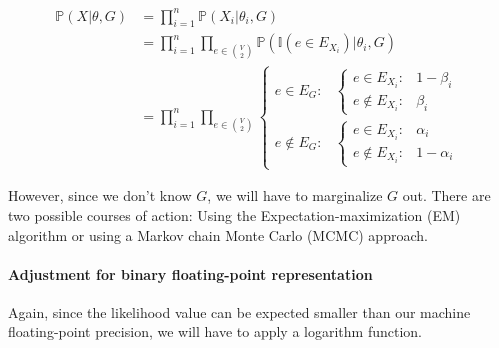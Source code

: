 \documentclass{scrartcl}
\newcommand{\prob}{\mathbb{P}}
\begin{document}
  
\begin{align*}
  \prob(X|\theta, G) &= \prod_{i=1}^n \prob(X_i|\theta_i,G)\\
  &= \prod_{i=1}^n \prod_{e \in \binom{V}{2}} \prob( \mathbb{I}(e \in E_{X_i})|\theta_i,G)\\
  &= \prod_{i=1}^n \prod_{e \in \binom{V}{2}} \begin{cases}
    e \in E_G: & 
    \begin{cases}
      e \in E_{X_i}: & 1-\beta_i\\
      e \notin E_{X_i}: & \beta_i
    \end{cases}
    \\
    e \notin E_G: & 
    \begin{cases}
      e \in E_{X_i}: & \alpha_i\\
      e \notin E_{X_i}: & 1-\alpha_i
    \end{cases}
  \end{cases}
\end{align*}

However, since we don't know $G$, we will have to marginalize $G$ out. There are two possible courses of action: Using the Expectation-maximization (EM) algorithm or using a Markov chain Monte Carlo (MCMC) approach.


\paragraph{Adjustment for binary floating-point representation}

Again, since the likelihood value can be expected smaller than our machine floating-point precision, we will have to apply a logarithm function.
\end{document}

